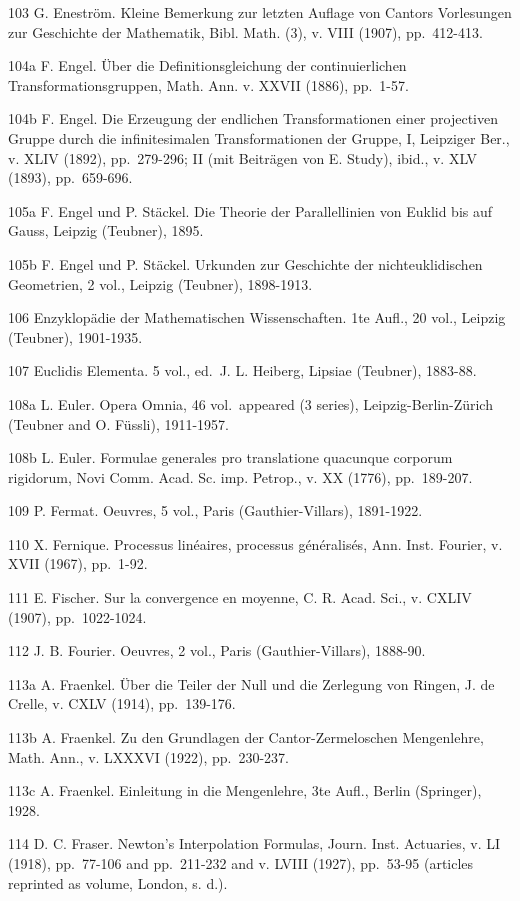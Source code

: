 103 G. Eneström. Kleine Bemerkung zur letzten Auflage von Cantors Vorlesungen zur Geschichte der Mathematik, Bibl. Math. (3), v. VIII (1907), pp.~412-413.

104a F. Engel. Über die Definitionsgleichung der continuierlichen Transformationsgruppen, Math. Ann. v. XXVII (1886), pp.~1-57.

104b F. Engel. Die Erzeugung der endlichen Transformationen einer projectiven Gruppe durch die infinitesimalen Transformationen der Gruppe, I, Leipziger Ber., v. XLIV (1892), pp.~279-296; II (mit Beiträgen von E. Study), ibid., v. XLV (1893), pp.~659-696.

105a F. Engel und P. Stäckel. Die Theorie der Parallellinien von Euklid bis auf Gauss, Leipzig (Teubner), 1895.

105b F. Engel und P. Stäckel. Urkunden zur Geschichte der nichteuklidischen Geometrien, 2 vol., Leipzig (Teubner), 1898-1913.

106 Enzyklopädie der Mathematischen Wissenschaften. 1te Aufl., 20 vol., Leipzig (Teubner), 1901-1935.

107 Euclidis Elementa. 5 vol., ed.~J. L. Heiberg, Lipsiae (Teubner), 1883-88.

108a L. Euler. Opera Omnia, 46 vol.~appeared (3 series), Leipzig-Berlin-Zürich (Teubner and O. Füssli), 1911-1957.

108b L. Euler. Formulae generales pro translatione quacunque corporum rigidorum, Novi Comm. Acad. Sc. imp. Petrop., v. XX (1776), pp.~189-207.

109 P. Fermat. Oeuvres, 5 vol., Paris (Gauthier-Villars), 1891-1922.

110 X. Fernique. Processus linéaires, processus généralisés, Ann. Inst. Fourier, v. XVII (1967), pp.~1-92.

111 E. Fischer. Sur la convergence en moyenne, C. R. Acad. Sci., v. CXLIV (1907), pp.~1022-1024.

112 J. B. Fourier. Oeuvres, 2 vol., Paris (Gauthier-Villars), 1888-90.

113a A. Fraenkel. Über die Teiler der Null und die Zerlegung von Ringen, J. de Crelle, v. CXLV (1914), pp.~139-176.

113b A. Fraenkel. Zu den Grundlagen der Cantor-Zermeloschen Mengenlehre, Math. Ann., v. LXXXVI (1922), pp.~230-237.

113c A. Fraenkel. Einleitung in die Mengenlehre, 3te Aufl., Berlin (Springer), 1928.

114 D. C. Fraser. Newton's Interpolation Formulas, Journ. Inst. Actuaries, v. LI (1918), pp.~77-106 and pp.~211-232 and v. LVIII (1927), pp.~53-95 (articles reprinted as volume, London, s. d.).

